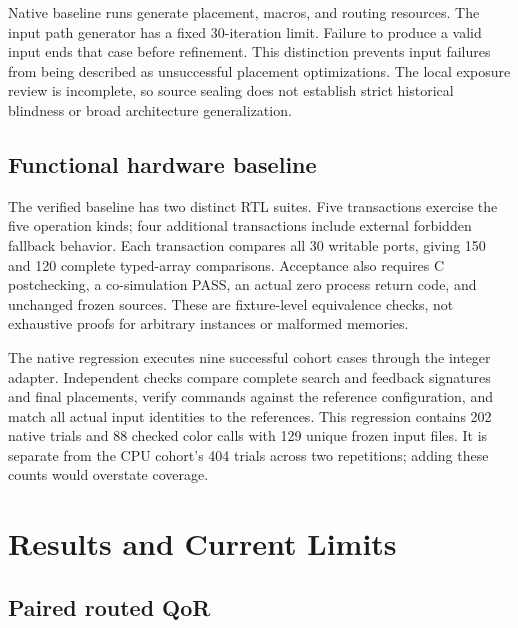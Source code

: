 \documentclass[conference,10pt]{IEEEtran}
\begin{document}
Native baseline runs generate placement, macros, and routing resources.
The input path generator has a fixed 30-iteration limit. Failure to produce
a valid input ends that case before refinement. This distinction prevents
input failures from being described as unsuccessful placement optimizations.
The local exposure review is incomplete, so source sealing does not establish
strict historical blindness or broad architecture generalization.

\subsection{Functional hardware baseline}

The verified baseline has two distinct RTL suites. Five transactions exercise
the five operation kinds; four additional transactions include external
forbidden fallback behavior. Each transaction compares all 30 writable ports,
giving 150 and 120 complete typed-array comparisons. Acceptance also requires
C postchecking, a co-simulation PASS, an actual zero process return code,
and unchanged frozen sources. These are fixture-level equivalence checks,
not exhaustive proofs for arbitrary instances or malformed memories.

The native regression executes nine successful cohort cases through the
integer adapter. Independent checks compare complete search and feedback
signatures and final placements, verify commands against the reference
configuration, and match all actual input identities to the references.
This regression contains 202 native trials and 88 checked color calls with
129 unique frozen input files. It is separate from the CPU cohort's 404
trials across two repetitions; adding these counts would overstate coverage.

\section{Results and Current Limits}

\subsection{Paired routed QoR}

\begin{table}[t]
\centering\small
\caption{All registered CPU cases. Geometric means use nine successful pairs;
four failures remain in the cohort denominator.}
\label{tab:cohort}

\end{table}
\end{document}
